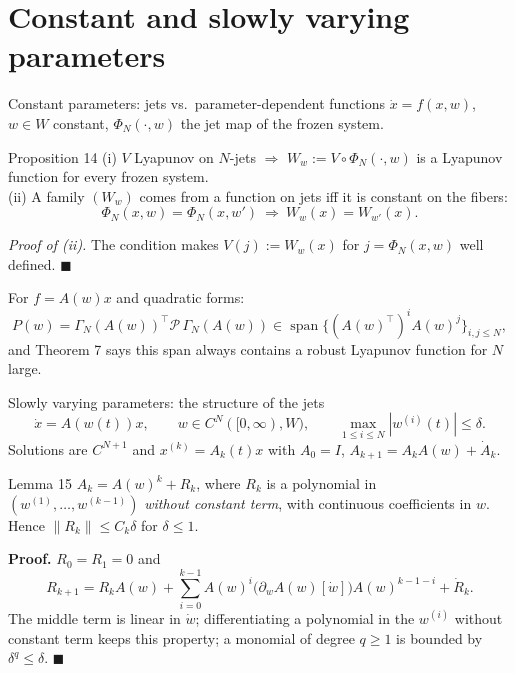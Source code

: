 \documentclass[10pt,aspectratio=169]{beamer}
\newcommand{\tr}{^{\top}}
\newcommand{\PP}{\mathcal{P}}
\DeclareMathOperator{\spn}{span}
\begin{document}
\section{Constant and slowly varying parameters}

\begin{frame}{Constant parameters: jets vs.\ parameter-dependent functions}
$\dot x=f(x,w)$, $w\in W$ constant, $\Phi_N(\cdot,w)$ the jet map of the frozen system.
\begin{block}{Proposition 14}
(i) $V$ Lyapunov on $N$-jets $\Rightarrow$ $W_w:=V\circ\Phi_N(\cdot,w)$ is a Lyapunov function for every frozen system.\\
(ii) A family $(W_w)$ comes from a function on jets iff it is \alert{constant on the fibers}:
\[
\Phi_N(x,w)=\Phi_N(x,w')\ \Longrightarrow\ W_w(x)=W_{w'}(x).
\]
\end{block}
\emph{Proof of (ii).} The condition makes $V(j):=W_w(x)$ for $j=\Phi_N(x,w)$ well defined. $\blacksquare$
\medskip

For $f=A(w)x$ and quadratic forms:
\[
P(w)=\Gamma_N(A(w))\tr\PP\,\Gamma_N(A(w))\in\spn\{(A(w)\tr)^iA(w)^j\}_{i,j\le N},
\]
and Theorem 7 says this span always contains a robust Lyapunov function for $N$ large.
\end{frame}

\begin{frame}{Slowly varying parameters: the structure of the jets}
\[
\dot x=A(w(t))x,\qquad w\in C^N([0,\infty),W),\qquad \max_{1\le i\le N}|w^{(i)}(t)|\le\delta .
\]
Solutions are $C^{N+1}$ and $x^{(k)}=A_k(t)x$ with $A_0=I$, $A_{k+1}=A_kA(w)+\dot A_k$.
\begin{block}{Lemma 15}
$A_k=A(w)^k+R_k$, where $R_k$ is a polynomial in $(w^{(1)},\dots,w^{(k-1)})$ \emph{without constant term}, with continuous coefficients in $w$. Hence $\|R_k\|\le C_k\delta$ for $\delta\le1$.
\end{block}
\textbf{Proof.} $R_0=R_1=0$ and
\[
R_{k+1}=R_kA(w)+\sum_{i=0}^{k-1}A(w)^i\big(\partial_wA(w)[\dot w]\big)A(w)^{k-1-i}+\dot R_k .
\]
The middle term is linear in $\dot w$; differentiating a polynomial in the $w^{(i)}$ without constant term keeps this property; a monomial of degree $q\ge1$ is bounded by $\delta^q\le\delta$. $\blacksquare$
\end{frame}
\end{document}
